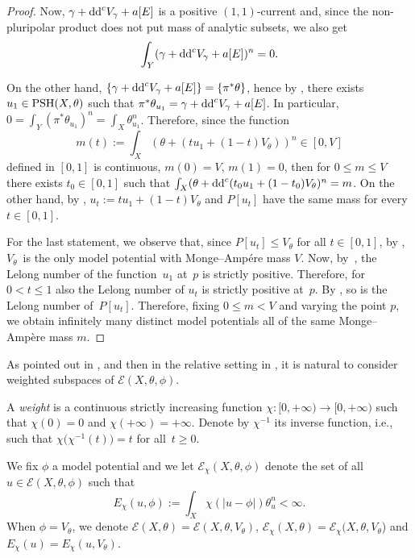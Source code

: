 \documentclass[11pt]{article}
\numberwithin{equation}{section}
\numberwithin{equation}{section}
\theoremstyle{plain}
\newcommand \PSH {{\rm PSH}}
\begin{document}
\begin{proof}
Now, $\gamma+{\rm dd}^c V_\gamma + a[E]$ is a positive $(1,1)$-current and, since the non-pluripolar product does not put mass of analytic subsets, we also get
\[\int_Y ( \gamma +{\rm dd}^c V_\gamma + a[E])^n = 0. \]

On the other hand, $\{\gamma+{\rm dd}^c V_\gamma + a[E]\}= \{ \pi^*\theta \}$, hence by \cite[Proposition 1.2.4]{BouThesis}, there exists~${u_1\in \PSH(X,\theta)}$ such that
$\pi^*\theta_{u_1} = \gamma +{\rm dd}^c V_\gamma + a[E]$.
In particular, $ 0=\int_Y (\pi^*\theta_{u_1})^n =\int_X \theta_{u_1}^n $.
Therefore, since the function
\[m(t) := \int_X ( \theta + (t u_1 + (1-t) V_\theta))^n \in [0, V] \]
defined in $[0,1]$ is continuous, $m(0)=V$, $m(1)=0$, then for $0 \leq m \leq V$ there exists $t_0\in [0,1]$ such that $\int_X (\theta + {\rm dd}^c ( t_0 u_1 + (1-t_0) V_\theta)^n = m$. On the other hand, by \cite[Remark 3.4]{DDL6}, $u_t := tu_1 + (1-t)V_\theta$ and $P[u_t]$ have the same mass for every $t \in [0,1]$.

For the last statement, we observe that, since $P[u_t] \leq V_\theta$ for all $t \in [0,1]$, by \cite[Theorem~3.14]{DDL6}, $V_\theta$~is the only model potential with Monge--Amp\'ere mass $V$. Now, by~\cite[Corollary~1.18]{BouThesis}, the Lelong number of the function~$u_1$ at~$p$ is strictly positive. Therefore, for $0 < t \leq 1$ also the Lelong number of $u_t$ is strictly positive at~$p$. By \cite[Lemma~5.1]{DDL6}, so is the Lelong number of~$P[u_t]$. Therefore, fixing $0 \leq m < V$ and varying the point $p$, we obtain infinitely many distinct model potentials all of the same Monge--Amp\`ere mass $m$.
\end{proof}

As pointed out in \cite{GZ07}, and then in the relative setting in \cite{Gup23}, it is natural to consider weighted subspaces of $\mathcal E(X,\theta,\phi)$.

A \emph{weight} is a continuous strictly increasing function $\chi\colon [0,+\infty) \rightarrow [0,+\infty)$ such that $\chi(0)=0$ and $\chi(+\infty)=+\infty$. Denote by $\chi^{-1}$ its inverse function, i.e., such that $\chi\big(\chi^{-1}(t)\big)= t$ for all~${t\geq 0}$.

We fix $\phi$ a model potential and we let $\mathcal{E}_{\chi}(X,\theta,\phi)$ denote the set of all $u\in \mathcal{E}(X,\theta,\phi)$ such that
\[
E_{\chi}(u,\phi):=\int_X \chi(|u-\phi|) \theta_u^n <\infty.
\]
When $\phi=V_{\theta}$, we denote $\mathcal{E}(X,\theta)=\mathcal{E}(X,\theta,V_{\theta})$, $\mathcal{E}_{\chi}(X,\theta)=\mathcal{E}_{\chi}(X,\theta,V_{\theta}$) and $E_{\chi}(u)=E_{\chi}(u,V_{\theta})$.
\end{document}
